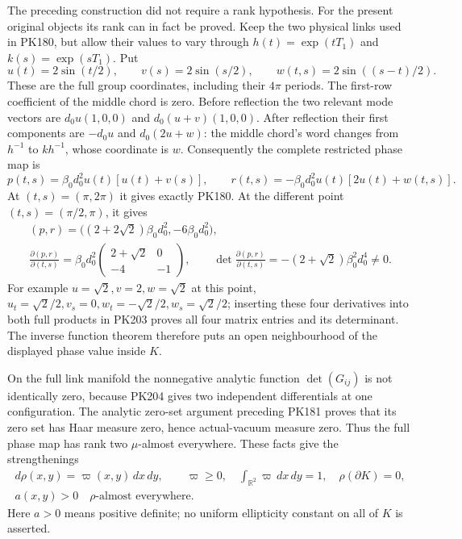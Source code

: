 \documentclass[11pt]{article}
\begin{document}
The preceding construction did not require a rank hypothesis.
For the present original objects its rank can in fact be proved.
Keep the two physical links used in PK180, but allow their values
to vary through
\(h(t)=\exp(tT_1)\) and \(k(s)=\exp(sT_1)\).
Put
\[
 u(t)=2\sin(t/2),\qquad v(s)=2\sin(s/2),\qquad
 w(t,s)=2\sin((s-t)/2).
\]
These are the full group coordinates, including their \(4\pi\)
periods. The first-row coefficient of the middle chord is zero.
Before reflection the two relevant mode vectors are
\(d_0u(1,0,0)\) and \(d_0(u+v)(1,0,0)\).
After reflection their first components are \(-d_0u\) and
\(d_0(2u+w)\): the middle chord's word changes from \(h^{-1}\)
to \(kh^{-1}\), whose coordinate is \(w\).
Consequently the complete restricted phase map is
\[
 p(t,s)=\beta_0d_0^2 u(t)[u(t)+v(s)],\qquad
 r(t,s)=-\beta_0d_0^2 u(t)[2u(t)+w(t,s)] .
 \tag{PK203}
\]
At \((t,s)=(\pi,2\pi)\) it gives exactly PK180.
At the different point \((t,s)=(\pi/2,\pi)\), it gives
\[
 \begin{gathered}
 (p,r)=\bigl((2+2\sqrt2)\beta_0d_0^2,-6\beta_0d_0^2\bigr),\\
 \frac{\partial(p,r)}{\partial(t,s)}
   =\beta_0d_0^2
          \begin{pmatrix}2+\sqrt2&0\\-4&-1\end{pmatrix},
 \qquad
 \det\frac{\partial(p,r)}{\partial(t,s)}
          =-(2+\sqrt2)\beta_0^2d_0^4\ne0 .
 \end{gathered}\tag{PK204}
\]
For example \(u=\sqrt2,v=2,w=\sqrt2\) at this point,
\(u_t=\sqrt2/2,v_s=0,w_t=-\sqrt2/2,w_s=\sqrt2/2\);
inserting these four derivatives into both full products
in PK203 proves all four matrix entries and its determinant.
The inverse function theorem therefore puts an open
neighbourhood of the displayed phase value inside \(K\).

On the full link manifold the nonnegative analytic function
\(\det(G_{ij})\) is not identically zero, because PK204 gives
two independent differentials at one configuration.
The analytic zero-set argument preceding PK181 proves that
its zero set has Haar measure zero, hence actual-vacuum
measure zero. Thus the full phase map has rank two
\(\mu\)-almost everywhere. These facts give the strengthenings
\[
 \begin{gathered}
 d\rho(x,y)=\varpi(x,y)\,dx\,dy,\qquad
 \varpi\ge0,\quad\int_{\mathbb R^2}\varpi\,dx\,dy=1,\quad
 \rho(\partial K)=0,\\
 a(x,y)>0\quad \rho\text{-almost everywhere}.
 \end{gathered}
 \tag{PK205}
\]
Here \(a>0\) means positive definite; no uniform ellipticity
constant on all of \(K\) is asserted.
\end{document}
